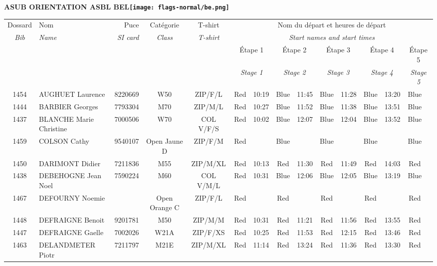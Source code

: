 \documentclass{report}
\begin{document}
\newpage
  \Huge \centering \bfseries ASUB ORIENTATION ASBL  BEL\normalfont \footnotesize \sffamily \hfill \texttt{[image: flags-normal/be.png]} \newline 
  \begin{longtable}{|c|l|r|c|c|*{5}{cc|}}
    Dossard & Nom  & Puce    & Catégorie & T-shirt & \multicolumn{10}{c|}{Nom du départ et heures de départ} \\
    \itshape Bib     & \itshape Name & \itshape SI card & \itshape Class  & \itshape  T-shirt  & \multicolumn{10}{c|}{\itshape Start names and start times} \\
    \hline
    & & & & & \multicolumn{2}{c|}{Étape 1} & \multicolumn{2}{c|}{Étape 2} & \multicolumn{2}{c|}{Étape 3} & \multicolumn{2}{c|}{Étape 4} & \multicolumn{2}{c|}{Étape 5} \\
    & & & & & \multicolumn{2}{c|}{\itshape Stage 1} & \multicolumn{2}{c|}{\itshape Stage 2} & \multicolumn{2}{c|}{\itshape Stage 3} & \multicolumn{2}{c|}{\itshape Stage 4} & \multicolumn{2}{c|}{\itshape Stage 5} \\
    \hline
    1454 & AUGHUET Laurence & 8220669 & W50 & ZIP/F/L & Red & 10:19 & Blue & 11:45 & Blue & 11:28 & Blue & 13:20 & Blue &  \\
    1444 & BARBIER Georges & 7793304 & M70 & ZIP/M/L & Red & 10:27 & Blue & 11:52 & Blue & 11:38 & Blue & 13:51 & Blue &  \\
    1437 & BLANCHE Marie Christine & 7000506 & W70 & COL V/F/S & Red & 10:02 & Blue & 12:07 & Blue & 12:04 & Blue & 13:52 & Blue &  \\
    1459 & COLSON Cathy & 9540107 & Open Jaune D & ZIP/F/M & Red &   & Blue &   & Blue &   & Blue &   & Blue &  \\
    1450 & DARIMONT Didier & 7211836 & M55 & ZIP/M/XL & Red & 10:13 & Red & 11:30 & Red & 11:49 & Red & 14:03 & Red &  \\
    1438 & DEBEHOGNE Jean Noel & 7590224 & M60 & COL V/M/L & Red & 10:31 & Blue & 12:06 & Blue & 12:05 & Blue & 13:19 & Blue &  \\
    1467 & DEFOURNY Noemie &  & Open Orange C & ZIP/F/L & Red &   & Red &   & Red &   & Red &   & Red &  \\
    1448 & DEFRAIGNE Benoit & 9201781 & M50 & ZIP/M/M & Red & 10:31 & Red & 11:21 & Red & 11:56 & Red & 13:55 & Red &  \\
    1447 & DEFRAIGNE Gaelle & 7002026 & W21A & ZIP/F/XS & Red & 10:25 & Red & 11:53 & Red & 12:15 & Red & 13:46 & Red &  \\
    1463 & DELANDMETER Piotr & 7211797 & M21E & ZIP/M/XL & Red & 11:14 & Red & 13:24 & Red & 11:36 & Red & 13:30 & Red &  \\

\end{longtable}
\end{document}
